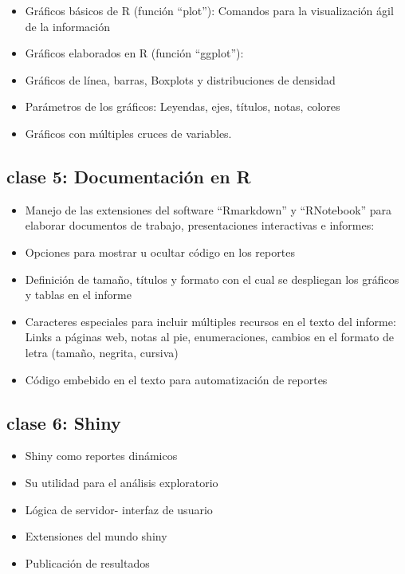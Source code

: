 \documentclass[]{book}
\providecommand{\tightlist}{%
  \setlength{\itemsep}{0pt}\setlength{\parskip}{0pt}}
\begin{document}
\begin{itemize}
\tightlist
\item
  Gráficos básicos de R (función ``plot''): Comandos para la visualización ágil de la información
\item
  Gráficos elaborados en R (función ``ggplot''):
\item
  Gráficos de línea, barras, Boxplots y distribuciones de densidad
\item
  Parámetros de los gráficos: Leyendas, ejes, títulos, notas, colores
\item
  Gráficos con múltiples cruces de variables.
\end{itemize}

\hypertarget{clase-5-documentacion-en-r}{%
\subsection{\texorpdfstring{\textbf{clase 5}: Documentación en R}{clase 5: Documentación en R}}\label{clase-5-documentacion-en-r}}

\begin{itemize}
\tightlist
\item
  Manejo de las extensiones del software ``Rmarkdown'' y ``RNotebook'' para elaborar documentos de trabajo, presentaciones interactivas e informes:
\item
  Opciones para mostrar u ocultar código en los reportes
\item
  Definición de tamaño, títulos y formato con el cual se despliegan los gráficos y tablas en el informe
\item
  Caracteres especiales para incluir múltiples recursos en el texto del informe: Links a páginas web, notas al pie, enumeraciones, cambios en el formato de letra (tamaño, negrita, cursiva)
\item
  Código embebido en el texto para automatización de reportes
\end{itemize}

\hypertarget{clase-6-shiny}{%
\subsection{\texorpdfstring{\textbf{clase 6}: Shiny}{clase 6: Shiny}}\label{clase-6-shiny}}

\begin{itemize}
\tightlist
\item
  Shiny como reportes dinámicos
\item
  Su utilidad para el análisis exploratorio
\item
  Lógica de servidor- interfaz de usuario
\item
  Extensiones del mundo shiny
\item
  Publicación de resultados
\end{itemize}
\end{document}
